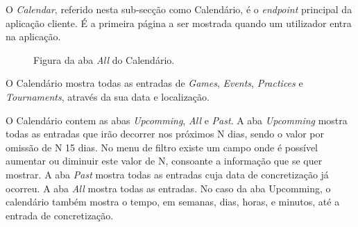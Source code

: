 O \textit{Calendar}, referido nesta sub-secção como Calendário, é o \textit{endpoint} principal da aplicação cliente. É a primeira página a ser mostrada quando um utilizador entra na aplicação. 

\begin{figure}[h]
	\begin{center}
	\end{center}
	\caption{Figura da aba \textit{All} do Calendário.}\label{fig:calendarall}
\end{figure}

O Calendário mostra todas as entradas de \textit{Games}, \textit{Events}, \textit{Practices} e \textit{Tournaments}, através da sua data e localização.

O Calendário contem as abas \textit{Upcomming}, \textit{All} e \textit{Past}. A aba \textit{Upcomming} mostra todas as entradas que irão decorrer nos próximos N dias, sendo o valor por omissão de N 15 dias. No menu de filtro existe um campo onde é possível aumentar ou diminuir este valor de N, consoante a informação que se quer mostrar. A aba \textit{Past} mostra todas as entradas cuja data de concretização já ocorreu. A aba \textit{All} mostra todas as entradas. No caso da aba Upcomming, o calendário também mostra o tempo, em semanas, dias, horas, e minutos, até a entrada de concretização.
\newpage

